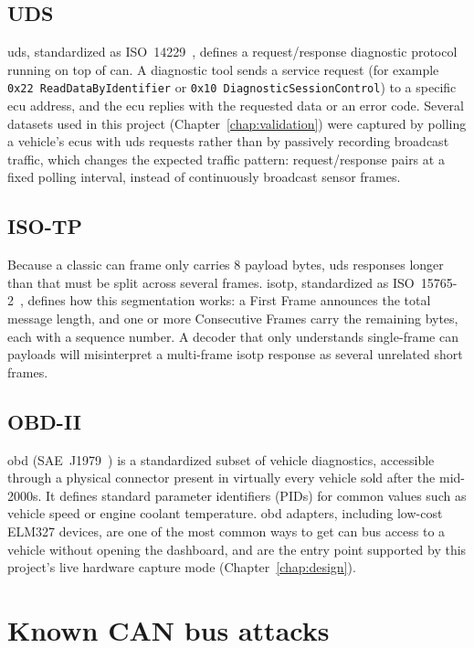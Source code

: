 \subsection{UDS}

\gls{uds}, standardized as ISO~14229~\cite{iso14229}, defines a request/response diagnostic protocol running on top of \gls{can}. A diagnostic tool sends a service request (for example \texttt{0x22 ReadDataByIdentifier} or \texttt{0x10 DiagnosticSessionControl}) to a specific \gls{ecu} address, and the \gls{ecu} replies with the requested data or an error code. Several datasets used in this project (Chapter~\ref{chap:validation}) were captured by polling a vehicle's \gls{ecu}s with \gls{uds} requests rather than by passively recording broadcast traffic, which changes the expected traffic pattern: request/response pairs at a fixed polling interval, instead of continuously broadcast sensor frames.

\subsection{ISO-TP}

Because a classic \gls{can} frame only carries 8 payload bytes, \gls{uds} responses longer than that must be split across several frames. \gls{isotp}, standardized as ISO~15765-2~\cite{iso15765}, defines how this segmentation works: a First Frame announces the total message length, and one or more Consecutive Frames carry the remaining bytes, each with a sequence number. A decoder that only understands single-frame \gls{can} payloads will misinterpret a multi-frame \gls{isotp} response as several unrelated short frames.

\subsection{OBD-II}

\gls{obd} (SAE~J1979~\cite{sae_j1979}) is a standardized subset of vehicle diagnostics, accessible through a physical connector present in virtually every vehicle sold after the mid-2000s. It defines standard parameter identifiers (PIDs) for common values such as vehicle speed or engine coolant temperature. \gls{obd} adapters, including low-cost ELM327 devices, are one of the most common ways to get \gls{can} bus access to a vehicle without opening the dashboard, and are the entry point supported by this project's live hardware capture mode (Chapter~\ref{chap:design}).

\section{Known CAN bus attacks}

